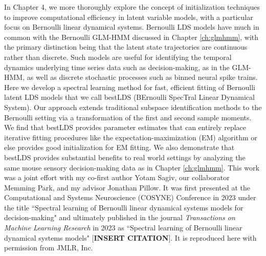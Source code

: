 In Chapter 4, we more thoroughly explore the concept of initialization techniques to improve computational efficiency in latent variable models, with a particular focus on Bernoulli linear dynamical systems. Bernoulli LDS models have much in common with the Bernoulli GLM-HMM discussed in Chapter \ref{ch:glmhmm}, with the primary distinction being that the latent state trajectories are continuous rather than discrete. Such models are useful for identifying the temporal dynamics underlying time series data such as decision-making, as in the GLM-HMM, as well as discrete stochastic processes
such as binned neural spike trains. Here we develop a spectral learning method for fast,
efficient fitting of Bernoulli latent LDS models that we call bestLDS (BErnoulli SpecTral Linear Dynamical System). Our approach extends traditional subspace identification methods to the Bernoulli setting via a transformation of the first and second sample moments. We find that bestLDS provides parameter estimates that can entirely replace iterative fitting procedures like the expectation-maximization (EM) algorithm or else provides good initialization for EM fitting. We also demonstrate that bestLDS provides substantial benefits to real world settings by analyzing the same mouse sensory decision-making data as in Chapter \ref{ch:glmhmm}. This work was a joint effort with my co-first author Yotam Sagiv, our collaborator Memming Park, and my advisor Jonathan Pillow. It was first presented at the Computational and Systems Neuroscience (COSYNE) Conference in 2023 under the title ``Spectral learning of Bernoulli linear dynamical systems models for decision-making" and ultimately published in the journal \textit{Transactions on Machine Learning Research} in 2023 as ``Spectral learning of Bernoulli linear dynamical systems models" [\textbf{INSERT CITATION}]. It is reproduced here with permission from JMLR, Inc. 
